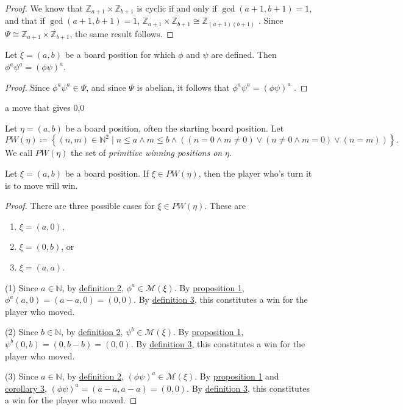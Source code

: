 \documentclass[11pt, letterpaper]{article}
\begin{document}
\begin{proof}
	We know that $\mathbb{Z}_{a+1}\times \mathbb{Z}_{b+1}$ is cyclic if and only if $\operatorname{gcd}(a+1,b+1) =1$, and that if $\operatorname{gcd}(a+1,b+1) =1$, $\mathbb{Z}_{a+1}\times \mathbb{Z}_{b+1}\cong \mathbb{Z}_{(a+1)(b+1)}$ \cite{gallian, judson}. Since $\Psi \cong \mathbb{Z}_{a+1}\times \mathbb{Z}_{b+1}$, the same result follows.
\end{proof}
\begin{corollary}\label{cor:3}
	Let $\xi =(a,b)$ be a board position for which $\phi $ and $\psi $ are defined. Then $\phi ^a\psi ^a=\left( \phi \psi  \right) ^a$.
\end{corollary}
\begin{proof}
	Since $\phi ^a\psi ^a\in \Psi $, and since $\Psi $ is abelian, it follows that $\phi ^a\psi ^a=\left( \phi \psi  \right) ^a$ \cite{gallian, judson}.
\end{proof}
\begin{definition}[Win]\label{dfn:3}
	a move that gives 0,0
\end{definition}
\begin{definition}\label{dfn:4}
	Let $\eta =(a,b)$ be a board position, often the starting board position. Let
	\[
		PW(\eta )\coloneqq \left\{ (n,m)\in\mathbb{N}^2 \mid n\leq a\land m\leq b\land \left( (n=0\land m\neq 0)\lor (n\neq 0\land m=0)\lor (n=m) \right)  \right\} 
	.\]
	We call $PW (\eta )$ the set of \emph{primitive winning positions on} $\eta $.
\end{definition}
\begin{proposition}\label{prp:2}
	Let $\xi =(a,b)$ be a board position. If $\xi \in PW (\eta )$, then the player who's turn it is to move will win.
\end{proposition}
\begin{proof}
	There are three possible cases for $\xi \in PW(\eta )$. These are
	\begin{enumerate}
		\item $\xi =(a,0)$,
		\item $\xi =(0,b)$, or
		\item $\xi =(a,a)$.
	\end{enumerate}
	(1) Since $a\in\mathbb{N}$, by \hyperref[dfn:2]{definition 2}, $\phi ^a\in\mathscr{M} (\xi )$. By \hyperref[prp:1]{proposition 1}, $\phi ^a(a,0)=(a-a,0)=(0,0)$. By \hyperref[dfn:3]{definition 3}, this constitutes a win for the player who moved.

	(2) Since $b\in\mathbb{N}$, by \hyperref[dfn:2]{definition 2}, $\psi ^b\in \mathscr{M} (\xi  )$. By \hyperref[prp:1]{proposition 1}, $\psi ^b(0,b)=(0,b-b)=(0,0)$. By \hyperref[dfn:3]{definition 3}, this constitutes a win for the player who moved.

	(3) Since $a\in\mathbb{N}$, by \hyperref[dfn:2]{definition 2}, $\left( \phi \psi  \right) ^a\in \mathscr{M} (\xi )$. By \hyperref[prp:1]{proposition 1} and \hyperref[cor:3]{corollary 3}, $\left( \phi \psi \right) ^a=(a-a,a-a)=(0,0)$. By \hyperref[dfn:3]{definition 3}, this constitutes a win for the player who moved.
\end{proof}
\end{document}
